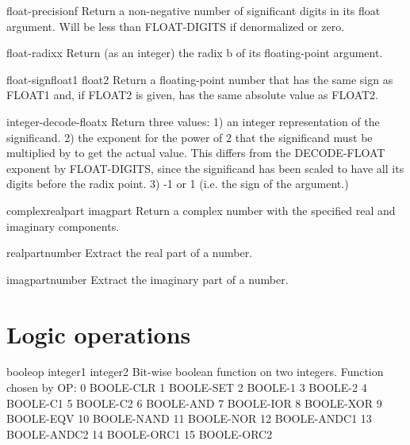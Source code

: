 \begin{function}{float-precision}{f}{}{}
  Return a non-negative number of significant digits in its float argument.
  Will be less than FLOAT-DIGITS if denormalized or zero.
\end{function}

\begin{function}{float-radix}{x}{}{}
  Return (as an integer) the radix b of its floating-point argument.
\end{function}

\begin{function}{float-sign}{float1 \op float2}{}{}
  Return a floating-point number that has the same sign as
   FLOAT1 and, if FLOAT2 is given, has the same absolute value
   as FLOAT2.
\end{function}

\begin{function}{integer-decode-float}{x}{}{}
  Return three values:
   1) an integer representation of the significand.
   2) the exponent for the power of 2 that the significand must be multiplied
      by to get the actual value. This differs from the DECODE-FLOAT exponent
      by FLOAT-DIGITS, since the significand has been scaled to have all its
      digits before the radix point.
   3) -1 or 1 (i.e. the sign of the argument.)
\end{function}

\begin{function}{complex}{realpart \op imagpart}{}{}
  Return a complex number with the specified real and imaginary components.
\end{function}

\begin{function}{realpart}{number}{}{}
  Extract the real part of a number.
\end{function}

\begin{function}{imagpart}{number}{}{}
  Extract the imaginary part of a number.
\end{function}

\section{Logic operations}
\label{sec:logic-operations}

\begin{function}{boole}{op integer1 integer2}{}{}
  Bit-wise boolean function on two integers. Function chosen by OP:
        0       BOOLE-CLR
        1       BOOLE-SET
        2       BOOLE-1
        3       BOOLE-2
        4       BOOLE-C1
        5       BOOLE-C2
        6       BOOLE-AND
        7       BOOLE-IOR
        8       BOOLE-XOR
        9       BOOLE-EQV
        10      BOOLE-NAND
        11      BOOLE-NOR
        12      BOOLE-ANDC1
        13      BOOLE-ANDC2
        14      BOOLE-ORC1
        15      BOOLE-ORC2
\end{function}

